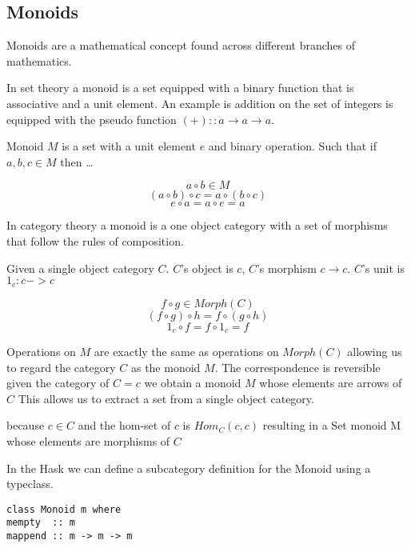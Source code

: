 \subsection{Monoids}

Monoids are a mathematical concept found across different branches of mathematics.

In set theory a monoid is a set equipped with a binary function that is associative and a unit element. An example is addition on the set of integers is equipped with the pseudo function $(+) :: a \rightarrow a \rightarrow a$.

Monoid $M$ is a set with a unit element $e$ and binary operation. Such that if $a,b,c \in M$ then \ldots

\begin{figure}[ht]
$$a \circ b \in M $$
$$(a \circ b) \circ c = a \circ (b \circ c)$$
$$e \circ a = a \circ e = a$$
\end{figure}

In category theory a monoid is a one object category with a set of morphisms that follow the rules of composition.

Given a single object category $C$. $C$'s object is $c$, $C$'s morphism $c \rightarrow c$. $C$'s unit is $1_c : c -> c$

\begin{figure}[ht]
$$f \circ g \in Morph(C)$$
$$(f \circ g) \circ h = f \circ (g \circ h) $$
$$1_c \circ f = f \circ 1_c = f$$
\end{figure}


Operations on $M$ are exactly the same as operations on $Morph(C)$ allowing us to regard the category $C$ as the monoid $M$. The correspondence is reversible given the category of $C = {c}$ we obtain a monoid $M$ whose elements are arrows of $C$ This allows us to extract a set from a single object category. 

because $c \in C$ and the hom-set of $c$ is $Hom_C(c,c)$ resulting in a Set monoid M whose elements are morphisms of $C$

In the Hask we can define a subcategory definition for the Monoid using a typeclass.
\begin{verbatim}
class Monoid m where
mempty  :: m
mappend :: m -> m -> m
\end{verbatim}